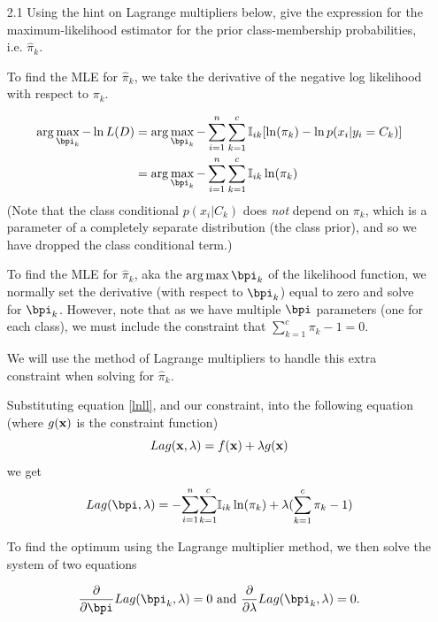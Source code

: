 \documentclass[submit]{harvardml}
\newenvironment{answer}{%
    \color{answergreen}\bf}
  {%
  }
\begin{document}
\begin{enumerate}
    \item[2.1]  Using the hint on Lagrange multipliers below, give the
    expression for the maximum-likelihood estimator for the prior
    class-membership probabilities, i.e.  $\hat \pi_k.$

    \begin{answer}

        To find the MLE for $\hat \pi_k$, we take the derivative of the
        negative log likelihood with respect to $\pi_k$. 
        
        \begin{align}
            \arg\max_{\bpi_k} 
            -\ln L(D) 
            &= \arg\max_{\bpi_k} 
                 - \sum_{i=1}^n \sum_{k=1}^c \mBI [
                    \ln(\pi_k) - \ln p(x_i| y_i = C_k) ]\\
            &= \arg\max_{\bpi_k} 
                 - \sum_{i=1}^n \sum_{k=1}^c \mBI 
                    \ln(\pi_k) \label{lnll}
        \end{align}
        (Note that the class conditional $p(x_i | C_k)$ does \textit{not} depend on
        $\pi_k$, which is a parameter of a completely separate distribution (the
        class prior), and so we have dropped the class conditional term.)

        To find the MLE for $\hat \pi_k$, aka the $\arg\max{\bpi_k}$ of the
        likelihood function, we normally set the derivative (with respect to
        $\bpi_k$) equal to zero and solve for $\bpi_k$. However, note
        that as we have multiple $\bpi$ parameters (one for each class), we must
        include the constraint that $\sum_{k=1}^c \pi_k-1=0$.

        We will use the method of Lagrange multipliers to handle this extra
        constraint when solving for $\hat \pi_k$.
            
        Substituting equation \eqref{lnll}, and our constraint, into the
        following equation (where $g(\mathbf{x})$ is the constraint function)
        $$
        Lag(\mathbf{x},\lambda) = f(\mathbf{x})+\lambda g(\mathbf{x}) \\
        $$
        we get
        $$
        Lag(\bpi,\lambda) 
            = - \lsum_{i=1}^n \lsum_{k=1}^c \mBI \ln(\pi_k) + \lambda( \sum_{k=1}^c\pi_k-1)
        $$

        To find the optimum using the Lagrange multiplier method, we then solve the system of two equations  

        \begin{equation*}
            \frac{\partial}{\partial \bpi} Lag(\bpi_k,\lambda)=0 \text{ and }
        \frac{\partial}{\partial\lambda} Lag(\bpi_k, \lambda)= 0.
        \end{equation*}
        

\end{answer}
\end{enumerate}
\end{document}
